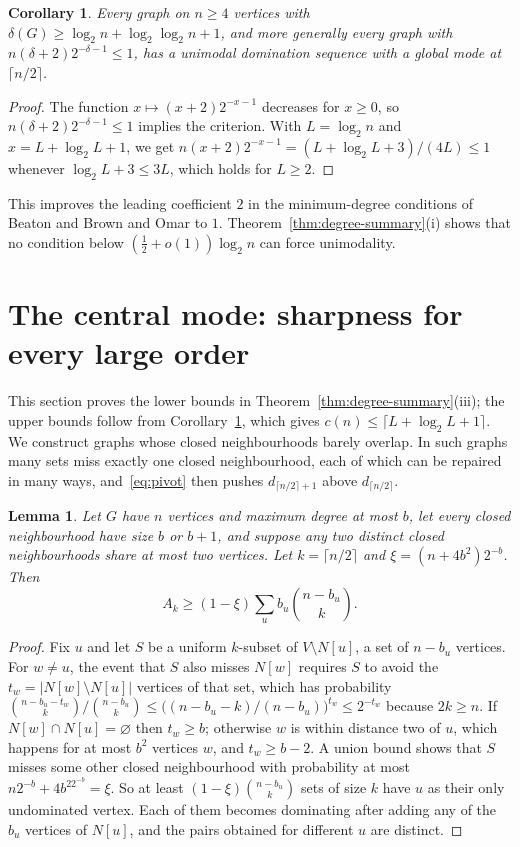 \documentclass[11pt,a4paper]{article}
\newtheorem{lemma}[theorem]{Lemma}
\newtheorem{corollary}[theorem]{Corollary}
\theoremstyle{definition}
\theoremstyle{remark}
\begin{document}
\begin{corollary}\label{cor:mindeg}
Every graph on $n\ge4$ vertices with $\delta(G)\ge\log_2n+\log_2\log_2n+1$, and more generally every graph with $n(\delta+2)2^{-\delta-1}\le1$, has a unimodal domination sequence with a global mode at $\lceil n/2\rceil$.
\end{corollary}
\begin{proof}
The function $x\mapsto(x+2)2^{-x-1}$ decreases for $x\ge0$, so $n(\delta+2)2^{-\delta-1}\le1$ implies the criterion. With $L=\log_2n$ and $x=L+\log_2L+1$, we get $n(x+2)2^{-x-1}=(L+\log_2L+3)/(4L)\le1$ whenever $\log_2L+3\le3L$, which holds for $L\ge2$.
\end{proof}
This improves the leading coefficient $2$ in the minimum-degree conditions of Beaton and Brown \cite[Theorem~3.2]{BB} and Omar \cite[Proposition~13]{Omar} to $1$. Theorem~\ref{thm:degree-summary}(i) shows that no condition below $(\tfrac12+o(1))\log_2n$ can force unimodality.

\section{The central mode: sharpness for every large order}\label{sec:central}
This section proves the lower bounds in Theorem~\ref{thm:degree-summary}(iii); the upper bounds follow from Corollary~\ref{cor:mindeg}, which gives $c(n)\le\lceil L+\log_2L+1\rceil$. We construct graphs whose closed neighbourhoods barely overlap. In such graphs many sets miss exactly one closed neighbourhood, each of which can be repaired in many ways, and~\eqref{eq:pivot} then pushes $d_{\lceil n/2\rceil+1}$ above $d_{\lceil n/2\rceil}$.

\begin{lemma}\label{lem:repairs}
Let $G$ have $n$ vertices and maximum degree at most $b$, let every closed neighbourhood have size $b$ or $b+1$, and suppose any two distinct closed neighbourhoods share at most two vertices. Let $k=\lceil n/2\rceil$ and $\xi=(n+4b^2)2^{-b}$. Then
\[
A_k\ge(1-\xi)\sum_{u}b_u\binom{n-b_u}{k}.
\]
\end{lemma}
\begin{proof}
Fix $u$ and let $S$ be a uniform $k$-subset of $V\setminus N[u]$, a set of $n-b_u$ vertices. For $w\ne u$, the event that $S$ also misses $N[w]$ requires $S$ to avoid the $t_w=|N[w]\setminus N[u]|$ vertices of that set, which has probability $\binom{n-b_u-t_w}{k}/\binom{n-b_u}{k}\le\bigl((n-b_u-k)/(n-b_u)\bigr)^{t_w}\le2^{-t_w}$ because $2k\ge n$. If $N[w]\cap N[u]=\varnothing$ then $t_w\ge b$; otherwise $w$ is within distance two of $u$, which happens for at most $b^2$ vertices $w$, and $t_w\ge b-2$. A union bound shows that $S$ misses some other closed neighbourhood with probability at most $n2^{-b}+4b^22^{-b}=\xi$. So at least $(1-\xi)\binom{n-b_u}{k}$ sets of size $k$ have $u$ as their only undominated vertex. Each of them becomes dominating after adding any of the $b_u$ vertices of $N[u]$, and the pairs obtained for different $u$ are distinct.
\end{proof}
\end{document}
